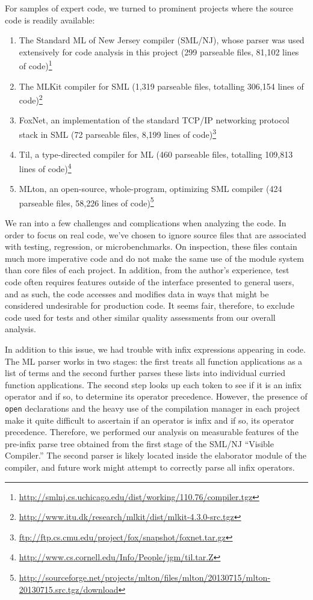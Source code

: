 \documentclass[12pt,abstracton]{scrartcl}
\begin{document}
For samples of expert code, we turned to prominent projects where the source code is readily available:
\begin{enumerate}
\item The Standard ML of New Jersey compiler (SML/NJ), whose parser was used extensively for code analysis in this project (299 parseable files, 81,102 lines of code)\footnote{\url{http://smlnj.cs.uchicago.edu/dist/working/110.76/compiler.tgz}}
\item The MLKit compiler for SML (1,319 parseable files, totalling 306,154 lines of code)\footnote{\url{http://www.itu.dk/research/mlkit/dist/mlkit-4.3.0-src.tgz}}
\item FoxNet, an implementation of the standard TCP/IP networking protocol stack in SML (72 parseable files, 8,199 lines of code)\footnote{\url{ftp://ftp.cs.cmu.edu/project/fox/snapshot/foxnet.tar.gz}}
\item Til, a type-directed compiler for ML (460 parseable files, totalling 109,813 lines of code)\footnote{\url{http://www.cs.cornell.edu/Info/People/jgm/til.tar.Z}}
\item MLton, an open-source, whole-program, optimizing SML compiler (424 parseable files, 58,226 lines of code)\footnote{\url{http://sourceforge.net/projects/mlton/files/mlton/20130715/mlton-20130715.src.tgz/download}}
\end{enumerate}

We ran into a few challenges and complications when analyzing the code.
In order to focus on real code, we've chosen to ignore source files that are associated
with testing, regression, or microbenchmarks. On inspection, these files contain much more imperative
code and do not make the same use of the module system than core files of each project.
In addition, from the author's experience, test code often requires features
outside of the interface presented to general users, and as such, the
code accesses and modifies data in ways that might be considered undesirable
for production code. It seems fair, therefore, to exclude code used for
tests and other similar quality assessments from our overall analysis.

In addition to this issue, we had trouble with infix expressions appearing in code.
The ML parser works in two stages: the first treats all function applications
as a list of terms and the second further parses these lists into individual
curried function applications. The second step looks up each token to
see if it is an infix operator and if so, to determine its
operator precedence. However,
the presence of \texttt{open} declarations and the
heavy use of the compilation manager in each project
make it quite difficult to ascertain if an
operator is infix and if so, its operator precedence.
Therefore, we performed our analysis on measurable features
of the pre-infix parse tree obtained from the first stage of the SML/NJ ``Visible Compiler.''
The second parser is likely located inside the elaborator module
of the compiler, and future work might attempt to
correctly parse all infix operators.
\end{document}

